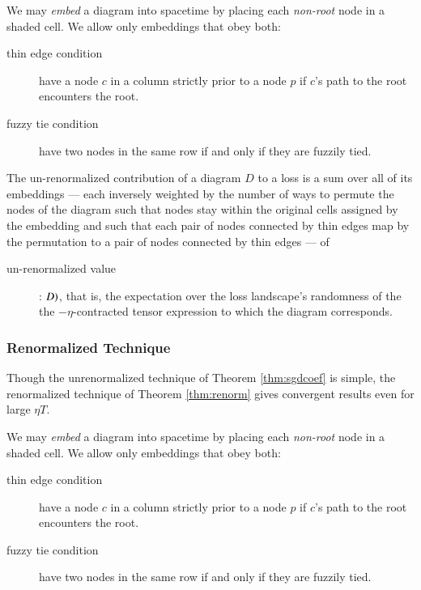 \documentclass{article}
\theoremstyle{plain}
\theoremstyle{definition}
\begin{document}
            We may \emph{embed} a diagram into spacetime by placing each
            \emph{non-root} node in a shaded cell.  We allow only embeddings
            that obey both:
            \begin{description}
                \item[thin edge condition] have a node $c$ in a column strictly
                    prior to a node $p$ if $c$'s path to the root encounters
                    the root.
                \item[fuzzy tie condition] have two nodes in the same row if
                    and only if they are fuzzily tied.
            \end{description}

            The un-renormalized contribution of a diagram $D$ to a loss is a
            sum over all of its embeddings --- each inversely weighted by the
            number of ways to permute the nodes of the diagram such that nodes
            stay within the original cells assigned by the embedding and such
            that each pair of nodes connected by thin edges map by the
            permutation to a pair of nodes connected by thin edges --- of
            \begin{description}
                \item[un-renormalized value]: $\value(D)$, that is, the
                    expectation over the loss landscape's randomness of the
                    the $-\eta$-contracted tensor expression to which the
                    diagram corresponds.
            \end{description}

        \subsubsection*{Renormalized Technique} 
            Though the unrenormalized technique of Theorem \ref{thm:sgdcoef} is
            simple, the renormalized technique of Theorem \ref{thm:renorm}
            gives convergent results even for large $\eta T$.

            We may \emph{embed} a diagram into spacetime by placing each
            \emph{non-root} node in a shaded cell.  We allow only embeddings
            that obey both:
            \begin{description}
                \item[thin edge condition] have a node $c$ in a column strictly
                    prior to a node $p$ if $c$'s path to the root encounters
                    the root.
                \item[fuzzy tie condition] have two nodes in the same row if
                    and only if they are fuzzily tied.
            \end{description}
\end{document}
